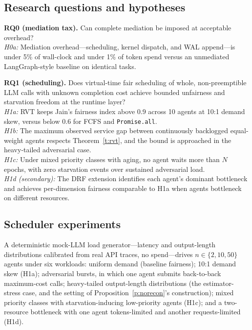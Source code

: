 \documentclass[letterpaper,11pt,leqno]{article}
\begin{document}
\subsection{Research questions and hypotheses}\label{s:questions}

\textbf{RQ0 (mediation tax).} Can complete mediation be imposed at acceptable overhead?\\
\emph{H0a:} Mediation overhead---scheduling, kernel dispatch, and WAL append---is under 5\% of wall-clock and under 1\% of token spend versus an unmediated LangGraph-style baseline on identical tasks.

\textbf{RQ1 (scheduling).} Does virtual-time fair scheduling of whole, non-preemptible LLM calls with unknown completion cost achieve bounded unfairness and starvation freedom at the runtime layer?\\
\emph{H1a:} RVT keeps Jain's fairness index \citep{Jain84} above 0.9 across 10 agents at 10:1 demand skew, versus below 0.6 for FCFS and \texttt{Promise.all}.\\
\emph{H1b:} The maximum observed service gap between continuously backlogged equal-weight agents respects Theorem~\ref{t:rvt}, and the bound is approached in the heavy-tailed adversarial case.\\
\emph{H1c:} Under mixed priority classes with aging, no agent waits more than $N$ epochs, with zero starvation events over sustained adversarial load.\\
\emph{H1d (secondary):} The DRF extension identifies each agent's dominant bottleneck and achieves per-dimension fairness comparable to H1a when agents bottleneck on different resources.

\subsection{Scheduler experiments}\label{s:experiments}

A deterministic mock-LLM load generator---latency and output-length distributions calibrated from real API traces, no spend---drives $n \in \{2, 10, 50\}$ agents under six workloads: uniform demand (baseline fairness); 10:1 demand skew (H1a); adversarial bursts, in which one agent submits back-to-back maximum-cost calls; heavy-tailed output-length distributions (the estimator-stress case, and the setting of Proposition~\ref{p:norecon}'s construction); mixed priority classes with starvation-inducing low-priority agents (H1c); and a two-resource bottleneck with one agent tokens-limited and another requests-limited (H1d).
\end{document}
